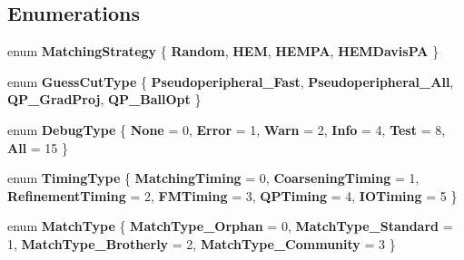 \subsection*{Enumerations}
\begin{DoxyCompactItemize}
\item 
\hypertarget{namespace_mongoose_a6f59634712403813cafd0879184469ae}{}\label{namespace_mongoose_a6f59634712403813cafd0879184469ae} 
enum {\bfseries Matching\+Strategy} \{ {\bfseries Random}, 
{\bfseries H\+EM}, 
{\bfseries H\+E\+M\+PA}, 
{\bfseries H\+E\+M\+Davis\+PA}
 \}
\item 
\hypertarget{namespace_mongoose_af092ffb972b126218f8eef0425f007e7}{}\label{namespace_mongoose_af092ffb972b126218f8eef0425f007e7} 
enum {\bfseries Guess\+Cut\+Type} \{ {\bfseries Pseudoperipheral\+\_\+\+Fast}, 
{\bfseries Pseudoperipheral\+\_\+\+All}, 
{\bfseries Q\+P\+\_\+\+Grad\+Proj}, 
{\bfseries Q\+P\+\_\+\+Ball\+Opt}
 \}
\item 
\hypertarget{namespace_mongoose_a7eceda98a2f475e3ad2e5c2863f4034c}{}\label{namespace_mongoose_a7eceda98a2f475e3ad2e5c2863f4034c} 
enum {\bfseries Debug\+Type} \{ \newline
{\bfseries None} = 0, 
{\bfseries Error} = 1, 
{\bfseries Warn} = 2, 
{\bfseries Info} = 4, 
\newline
{\bfseries Test} = 8, 
{\bfseries All} = 15
 \}
\item 
\hypertarget{namespace_mongoose_ad2aa39a9ad52fd6839bf59774c13ce3d}{}\label{namespace_mongoose_ad2aa39a9ad52fd6839bf59774c13ce3d} 
enum {\bfseries Timing\+Type} \{ \newline
{\bfseries Matching\+Timing} = 0, 
{\bfseries Coarsening\+Timing} = 1, 
{\bfseries Refinement\+Timing} = 2, 
{\bfseries F\+M\+Timing} = 3, 
\newline
{\bfseries Q\+P\+Timing} = 4, 
{\bfseries I\+O\+Timing} = 5
 \}
\item 
\hypertarget{namespace_mongoose_ac32d7c700642b419d0aa42107c6599a5}{}\label{namespace_mongoose_ac32d7c700642b419d0aa42107c6599a5} 
enum {\bfseries Match\+Type} \{ {\bfseries Match\+Type\+\_\+\+Orphan} = 0, 
{\bfseries Match\+Type\+\_\+\+Standard} = 1, 
{\bfseries Match\+Type\+\_\+\+Brotherly} = 2, 
{\bfseries Match\+Type\+\_\+\+Community} = 3
 \}
\end{DoxyCompactItemize}
